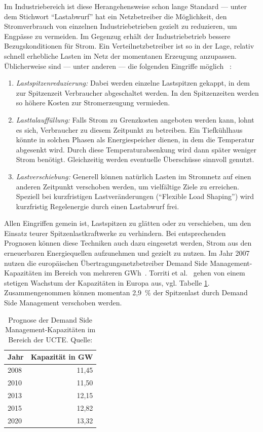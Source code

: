 \documentclass[12pt,BCOR=8.5mm]{scrartcl}
\begin{document}
Im Industriebereich ist diese Herangehensweise schon lange Standard ---
unter dem Stichwort "`Lastabwurf"' hat ein Netzbetreiber die
Möglichkeit, den Stromverbrauch von einzelnen Industriebetrieben gezielt
zu reduzieren, um Engpässe zu vermeiden. Im Gegenzug erhält der
Industriebetrieb bessere Bezugskonditionen für Strom. Ein
Verteilnetzbetreiber ist so in der Lage, relativ schnell erhebliche
Lasten im Netz der momentanen Erzeugung anzupassen. Üblicherweise sind
--- unter anderen --- die folgenden Eingriffe möglich \cite[S.
23f]{wiechmann08lastmanagement}~\cite[S. 85ff]{bmwi06eenergy}:

\begin{enumerate}
  \item \emph{Lastspitzenreduzierung:} Dabei werden einzelne Lastspitzen
    gekappt, in dem zur Spitzenzeit Verbraucher abgeschaltet werden. In
    den Spitzenzeiten werden so höhere Kosten zur Stromerzeugung
    vermieden.
  \item \emph{Lasttalauffüllung:} Falls Strom zu Grenzkosten angeboten
    werden kann, lohnt es sich, Verbraucher zu diesem Zeitpunkt zu
    betreiben. Ein Tiefkühlhaus könnte in solchen Phasen als
    Energiespeicher dienen, in dem die Temperatur abgesenkt wird. Durch
    diese Temperaturabsenkung wird dann später weniger Strom benötigt.
    Gleichzeitig werden eventuelle Überschüsse sinnvoll genutzt.
  \item \emph{Lastverschiebung:} Generell können natürlich Lasten im
    Stromnetz auf einen anderen Zeitpunkt verschoben werden, um
    vielfältige Ziele zu erreichen. Speziell bei kurzfristigen
    Lastveränderungen ("`Flexible Load Shaping"') wird kurzfristig
    Regelenergie durch einen Lastabwurf frei.
\end{enumerate}

Allen Eingriffen gemein ist, Lastspitzen zu glätten oder zu verschieben,
um den Einsatz teurer Spitzenlastkraftwerke zu verhindern. Bei
entsprechenden Prognosen können diese Techniken auch dazu eingesetzt
werden, Strom aus den erneuerbaren Energiequellen aufzunehmen und
gezielt zu nutzen. Im Jahr 2007 nutzen die europäischen
Übertragungsnetzbetreiber Demand Side Management-Kapazitäten im Bereich von
mehreren GWh~\cite{etso07demand}. Torriti et al.~\cite{torriti10demand}
gehen von einem stetigen Wachstum der Kapazitäten in Europa aus, vgl.
Tabelle \ref{tab:drforecast}. Zusammengenommen können momentan 2,9~\% der
Spitzenlast durch Demand Side Management verschoben werden.

\begin{table}
  \centering
  \begin{tabular}{|l|r|}
    \hline
    Jahr & Kapazität in GW \\
    \hline
    2008 & 11,45\\
    2010 & 11,50\\
    2013 & 12,15 \\
    2015 & 12,82 \\
    2020 & 13,32 \\
    \hline
  \end{tabular}
  \caption{Prognose der Demand Side Management-Kapazitäten im Bereich
  der UCTE. Quelle: \cite{torriti10demand}}
  \label{tab:drforecast}
\end{table}
\end{document}
